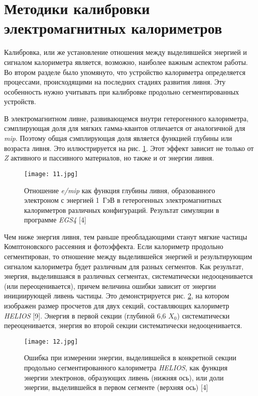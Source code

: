 \newpage
\section{Методики калибровки электромагнитных калориметров}  \label{chap3}  

Калибровка,  или  же  установление  отношения  между  выделившейся энергией  и  сигналом  калориметра  является,  возможно,  наиболее  важным аспектом  работы. Во  втором  разделе  было  упомянуто,  что  устройство калориметра  определяется  процессами,  происходящими  на  последних стадиях развития ливня. Эту особенность нужно учитывать при калибровке продольно сегментированных устройств. 

В  электромагнитном  ливне,  развивающемся  внутри гетерогенного калориметра, сэмплирующая доля для мягких гамма-квантов отличается от аналогичной  для \textit{mip}.  Поэтому  общая  сэмплирующая  доля  является  функцией глубины или возраста ливня. Это иллюстрируется на рис. \ref{fig:eDivMipDepth}. Этот эффект зависит не только от \textit{Z} активного и пассивного материалов, но также и от энергии ливня.

\begin{figure}[H]
    \centering
    \texttt{[image: 11.jpg]}
    \caption{Отношение \textit{e/mip} как функция глубины ливня, образованного электроном с энергией \mbox{1 ГэВ} в гетерогенных электромагнитных калориметров различных конфигураций. Результат симуляции в программе \textit{EGS4} [4]}
    \label{fig:eDivMipDepth}
\end{figure}

Чем  ниже  энергия  ливня,  тем  раньше  преобладающими  станут  мягкие частицы  Комптоновского  рассеяния  и  фотоэффекта.  Если  калориметр продольно  сегментирован,  то  отношение между  выделившейся  энергией  и результирующим  сигналом  калориметра  будет  различным  для  разных сегментов.  Как  результат,  энергия,  выделившаяся  в  различных  сегментах, систематически  недооценивается (или  переоценивается),  причем  величина ошибки зависит  от  энергии  инициирующей  ливень  частицы. Это демонстрируется рис. \ref{fig:helCal}, на котором изображен размер просчетов для двух секций,  составляющих  калориметр \textit{HELIOS} [9]. Энергия  в  первой  секции (глубиной 6,6 $X_0$) систематически переоценивается, энергия во второй секции систематически недооценивается.

\begin{figure}[H]
    \centering
    \texttt{[image: 12.jpg]}
    \caption{Ошибка при измерении энергии, выделившейся в конкретной секции продольно сегментированного калориметра \textit{HELIOS}, как функция энергии электронов, образующих ливень (нижняя ось), или доли энергии, выделившейся в первом сегменте (верхняя ось) [4]}
    \label{fig:helCal}
\end{figure}

